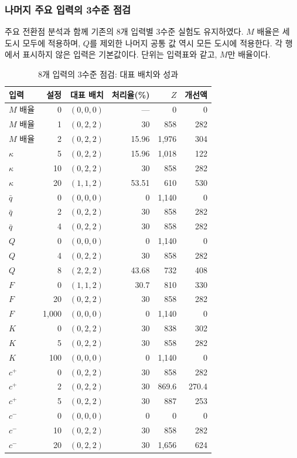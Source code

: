 \documentclass[10pt,a4paper]{article}
\begin{document}
\subsubsection{나머지 주요 입력의 3수준 점검}
주요 전환점 분석과 함께 기존의 8개 입력별 3수준 실험도 유지하였다.
$M$ 배율은 세 도시 모두에 적용하며, $Q$를 제외한 나머지 공통 값 역시 모든 도시에 적용한다.
각 행에서 표시하지 않은 입력은 기본값이다. 단위는 입력표와 같고, $M$만 배율이다.
\begin{table}[H]
\centering\small
\caption{8개 입력의 3수준 점검: 대표 배치와 성과}\label{tab:sc-original24}
\begin{tabular}{lrrrrr}
\toprule
입력 & 설정 & 대표 배치 & 처리율(\%) & $Z$ & 개선액\\\midrule
$M$ 배율 & 0 & $(0,0,0)$ & --- & 0 & 0\\
$M$ 배율 & 1 & $(0,2,2)$ & 30 & 858 & 282\\
$M$ 배율 & 2 & $(0,2,2)$ & 15.96 & 1,976 & 304\\
$\kappa$ & 5 & $(0,2,2)$ & 15.96 & 1,018 & 122\\
$\kappa$ & 10 & $(0,2,2)$ & 30 & 858 & 282\\
$\kappa$ & 20 & $(1,1,2)$ & 53.51 & 610 & 530\\
$\bar q$ & 0 & $(0,0,0)$ & 0 & 1,140 & 0\\
$\bar q$ & 2 & $(0,2,2)$ & 30 & 858 & 282\\
$\bar q$ & 4 & $(0,2,2)$ & 30 & 858 & 282\\
$Q$ & 0 & $(0,0,0)$ & 0 & 1,140 & 0\\
$Q$ & 4 & $(0,2,2)$ & 30 & 858 & 282\\
$Q$ & 8 & $(2,2,2)$ & 43.68 & 732 & 408\\
$F$ & 0 & $(1,1,2)$ & 30.7 & 810 & 330\\
$F$ & 20 & $(0,2,2)$ & 30 & 858 & 282\\
$F$ & 1,000 & $(0,0,0)$ & 0 & 1,140 & 0\\
$K$ & 0 & $(0,2,2)$ & 30 & 838 & 302\\
$K$ & 5 & $(0,2,2)$ & 30 & 858 & 282\\
$K$ & 100 & $(0,0,0)$ & 0 & 1,140 & 0\\
$c^+$ & 0 & $(0,2,2)$ & 30 & 858 & 282\\
$c^+$ & 2 & $(0,2,2)$ & 30 & 869.6 & 270.4\\
$c^+$ & 5 & $(0,2,2)$ & 30 & 887 & 253\\
$c^-$ & 0 & $(0,0,0)$ & 0 & 0 & 0\\
$c^-$ & 10 & $(0,2,2)$ & 30 & 858 & 282\\
$c^-$ & 20 & $(0,2,2)$ & 30 & 1,656 & 624\\
\bottomrule
\end{tabular}
\end{table}
\end{document}
